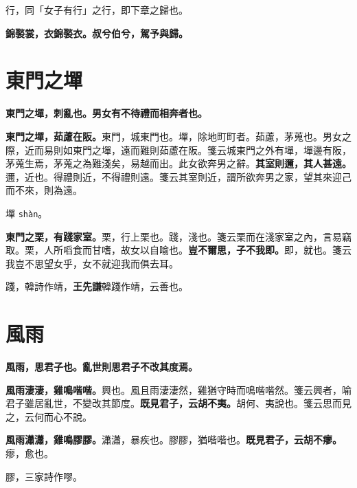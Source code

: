 \begin{quoting}行，同「女子有行」之行，即下章之歸也。\end{quoting}

\textbf{錦褧裳，衣錦褧衣。叔兮伯兮，駕予與歸。}

\section{東門之墠}


\textbf{東門之墠，刺亂也。男女有不待禮而相奔者也。}

\textbf{東門之墠，茹藘在阪。}{\footnotesize 東門，城東門也。墠，除地町町者。茹藘，茅蒐也。男女之際，近而易則如東門之墠，遠而難則茹藘在阪。箋云城東門之外有墠，墠邊有阪，茅蒐生焉，茅蒐之為難淺矣，易越而出。此女欲奔男之辭。}\textbf{其室則邇，其人甚遠。}{\footnotesize 邇，近也。得禮則近，不得禮則遠。箋云其室則近，謂所欲奔男之家，望其來迎己而不來，則為遠。}

\begin{quoting}墠 \texttt{shàn}。\end{quoting}

\textbf{東門之栗，有踐家室。}{\footnotesize 栗，行上栗也。踐，淺也。箋云栗而在淺家室之內，言易竊取。栗，人所㗖食而甘嗜，故女以自喻也。}\textbf{豈不爾思，子不我即。}{\footnotesize 即，就也。箋云我豈不思望女乎，女不就迎我而俱去耳。}

\begin{quoting}踐，韓詩作靖，\textbf{王先謙}韓踐作靖，云善也。\end{quoting}

\section{風雨}


\textbf{風雨，思君子也。亂世則思君子不改其度焉。}

\textbf{風雨淒淒，雞鳴喈喈。}{\footnotesize 興也。風且雨淒淒然，雞猶守時而鳴喈喈然。箋云興者，喻君子雖居亂世，不變改其節度。}\textbf{既見君子，云胡不夷。}{\footnotesize 胡何、夷說也。箋云思而見之，云何而心不說。}

\textbf{風雨瀟瀟，雞鳴膠膠。}{\footnotesize 瀟瀟，暴疾也。膠膠，猶喈喈也。}\textbf{既見君子，云胡不瘳。}{\footnotesize 瘳，愈也。}

\begin{quoting}膠，三家詩作嘐。\end{quoting}

